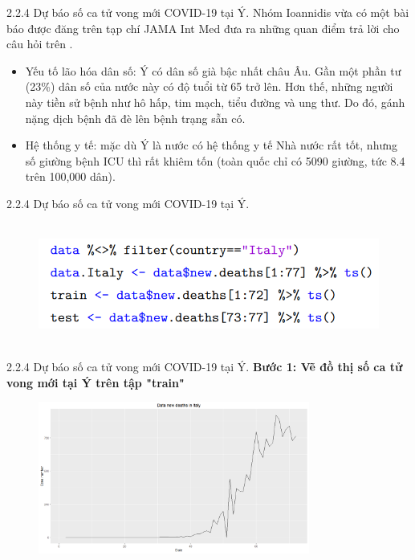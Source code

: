 \documentclass[notheorems,envcountsect,hyperref=unicode]{beamer}
\begin{document}
\begin{frame}{2.2.4 Dự báo số ca tử vong mới COVID-19 tại Ý.}
Nhóm Ioannidis vừa có một bài báo được đăng trên tạp chí JAMA Int Med đưa ra những quan điểm trả lời cho câu hỏi trên \cite{16}.
\begin{itemize}
	\item Yếu tố lão hóa dân số: Ý có dân số già bậc nhất châu Âu. Gần một phần tư (23\%) dân số của nước này có độ tuổi từ 65 trở lên. Hơn thế, những người này tiền sử bệnh như hô hấp, tim mạch, tiểu đường và ung thư. Do đó, gánh nặng dịch bệnh đã đè lên bệnh trạng sẵn có.
	\item Hệ thống y tế: mặc dù Ý là nước có hệ thống y tế Nhà nước rất tốt, nhưng số giường bệnh ICU thì rất khiêm tốn (toàn quốc chỉ có 5090 giường, tức 8.4 trên 100,000 dân).
\end{itemize}
\end{frame}

\begin{frame}{2.2.4 Dự báo số ca tử vong mới COVID-19 tại Ý.}
	\begin{figure}[!htb]
	\centering
	\includegraphics[width=1\linewidth,height=4cm]{duong4} 
\end{figure}
\end{frame}

\begin{frame}{2.2.4 Dự báo số ca tử vong mới COVID-19 tại Ý.}
\textbf{Bước 1: Vẽ đồ thị số ca tử vong mới tại Ý trên tập "train"}\\
	\begin{figure}[!htb]
		\centering
		\includegraphics[width=1\linewidth,height=5cm]{I1} 
	\end{figure}
\end{frame}
\end{document}
